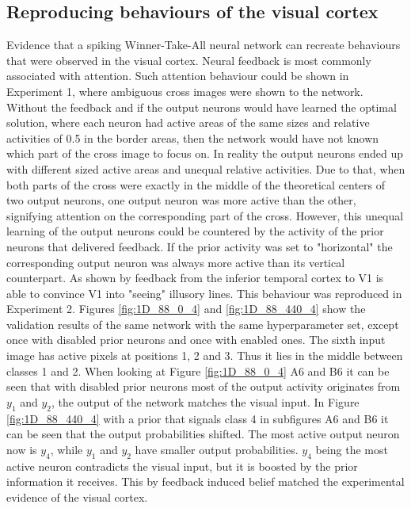 \subsection{Reproducing behaviours of the visual cortex}

Evidence that a spiking Winner-Take-All neural network can recreate behaviours that were observed in the visual cortex. Neural feedback is most commonly associated with attention. Such attention behaviour could be shown in Experiment 1, where ambiguous cross images were shown to the network. Without the feedback and if the output neurons would have learned the optimal solution, where each neuron had active areas of the same sizes and relative activities of 0.5 in the border areas, then the network would have not known which part of the cross image to focus on. In reality the output neurons ended up with different sized active areas and unequal relative activities. Due to that, when both parts of the cross were exactly in the middle of the theoretical centers of two output neurons, one output neuron was more active than the other, signifying attention on the corresponding part of the cross. However, this unequal learning of the output neurons could be countered by the activity of the prior neurons that delivered feedback. If the prior activity was set to "horizontal" the corresponding output neuron was always more active than its vertical counterpart. As shown by \citet{HierachicalBayesVisualCortex} feedback from the inferior temporal cortex to V1 is able to convince V1 into "seeing" illusory lines. This behaviour was reproduced in Experiment 2. Figures \ref{fig:1D_88_0_4} and \ref{fig:1D_88_440_4} show the validation results of the same network with the same hyperparameter set, except once with disabled prior neurons and once with enabled ones. The sixth input image has active pixels at positions 1, 2 and 3. Thus it lies in the middle between classes 1 and 2. When looking at Figure \ref{fig:1D_88_0_4} A6 and B6 it can be seen that with disabled prior neurons most of the output activity originates from $y_1$ and $y_2$, the output of the network  matches the visual input. In Figure \ref{fig:1D_88_440_4} with a prior that signals class 4 in subfigures A6 and B6 it can be seen that the output probabilities shifted. The most active output neuron now is $y_4$, while $y_1$ and $y_2$ have smaller output probabilities. $y_4$ being the most active neuron contradicts the visual input, but it is boosted by the prior information it receives. This by feedback induced belief matched the experimental evidence of the visual cortex.

